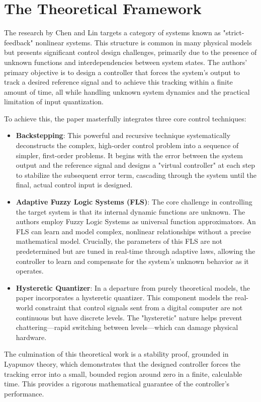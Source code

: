 \FloatBarrier
\section{The Theoretical Framework}
The research by Chen and Lin targets a category of systems known as "strict-feedback" nonlinear systems. This structure is common in many physical models but presents significant control design challenges, primarily due to the presence of unknown functions and interdependencies between system states. The authors' primary objective is to design a controller that forces the system's output to track a desired reference signal and to achieve this tracking within a finite amount of time, all while handling unknown system dynamics and the practical limitation of input quantization.

To achieve this, the paper masterfully integrates three core control techniques:

\begin{itemize}
	\item \textbf{Backstepping}: This powerful and recursive technique systematically deconstructs the complex, high-order control problem into a sequence of simpler, first-order problems. It begins with the error between the system output and the reference signal and designs a "virtual controller" at each step to stabilize the subsequent error term, cascading through the system until the final, actual control input is designed.
	\item \textbf{Adaptive Fuzzy Logic Systems (FLS)}: The core challenge in controlling the target system is that its internal dynamic functions are unknown. The authors employ Fuzzy Logic Systems as universal function approximators. An FLS can learn and model complex, nonlinear relationships without a precise mathematical model. Crucially, the parameters of this FLS are not predetermined but are tuned in real-time through adaptive laws, allowing the controller to learn and compensate for the system's unknown behavior as it operates.
	\item \textbf{Hysteretic Quantizer}: In a departure from purely theoretical models, the paper incorporates a hysteretic quantizer. This component models the real-world constraint that control signals sent from a digital computer are not continuous but have discrete levels. The "hysteretic" nature helps prevent chattering—rapid switching between levels—which can damage physical hardware.
\end{itemize}

The culmination of this theoretical work is a stability proof, grounded in Lyapunov theory, which demonstrates that the designed controller forces the tracking error into a small, bounded region around zero in a finite, calculable time. This provides a rigorous mathematical guarantee of the controller's performance.

